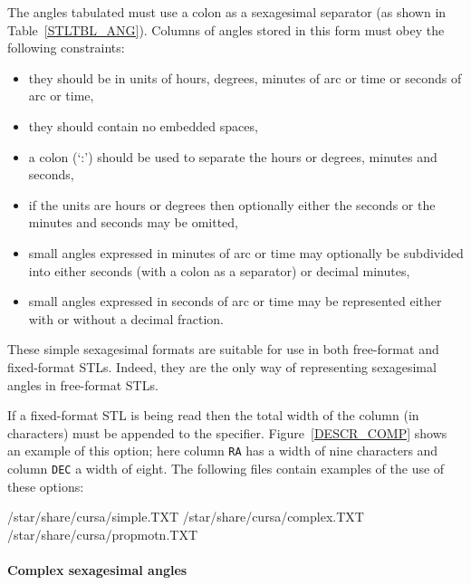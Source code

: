 \documentclass[twoside,11pt]{starlink}
\begin{document}
The angles tabulated must use a colon as a sexagesimal separator (as shown
in Table~\ref{STLTBL_ANG}).  Columns of angles stored in this form must
obey the following constraints:

\begin{itemize}

  \item they should be in units of hours, degrees, minutes of arc or
   time or seconds of arc or time,

  \item they should contain no embedded spaces,

  \item a colon (`:') should be used to separate the hours or degrees,
   minutes and seconds,

  \item if the units are hours or degrees then optionally either the
   seconds or the minutes and seconds may be omitted,

  \item small angles expressed in minutes of arc or time may optionally
   be subdivided into either seconds (with a colon as a separator) or
   decimal minutes,

  \item small angles expressed in seconds of arc or time may be
   represented either with or without a decimal fraction.

\end{itemize}

These simple sexagesimal formats are suitable for use in both
free-format and fixed-format STLs.  Indeed, they are the only way of
representing sexagesimal angles in free-format STLs.

If a fixed-format STL is being read then the total width of the column
(in characters) must be appended to the specifier.
Figure~\ref{DESCR_COMP} shows an example of this option; here column
\texttt{RA} has a width of nine characters and column \texttt{DEC} a width
of eight.  The following files contain examples of the use of these
options:

\begin{terminalv}
/star/share/cursa/simple.TXT
/star/share/cursa/complex.TXT
/star/share/cursa/propmotn.TXT
\end{terminalv}

\paragraph{Complex sexagesimal angles}
\end{document}
